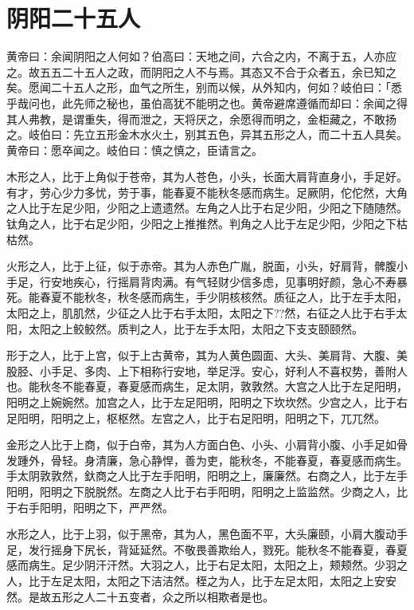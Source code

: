 \documentclass[a4paper,12pt,UTF8,twoside]{ctexbook}
\begin{document}
	\chapter{阴阳二十五人}
	
	黄帝曰：余闻阴阳之人何如？伯高曰：天地之间，六合之内，不离于五，人亦应之。故五五二十五人之政，而阴阳之人不与焉。其态又不合于众者五，余已知之矣。愿闻二十五人之形，血气之所生，别而以候，从外知内，何如？岐伯曰：「悉乎哉问也，此先师之秘也，虽伯高犹不能明之也。黄帝避席遵循而却曰：余闻之得其人弗教，是谓重失，得而泄之，天将厌之，余愿得而明之，金柜藏之，不敢扬之。岐伯曰：先立五形金木水火土，别其五色，异其五形之人，而二十五人具矣。黄帝曰：愿卒闻之。岐伯曰：慎之慎之，臣请言之。
	
	木形之人，比于上角似于苍帝，其为人苍色，小头，长面大肩背直身小，手足好。有才，劳心少力多忧，劳于事，能春夏不能秋冬感而病生。足厥阴，佗佗然，大角之人比于左足少阳，少阳之上遗遗然。左角之人比于右足少阳，少阳之下随随然。钛角之人，比于右足少阳，少阳之上推推然。判角之人比于左足少阳，少阳之下枯枯然。
	
	火形之人，比于上征，似于赤帝。其为人赤色广胤，脱面，小头，好肩背，髀腹小手足，行安地疾心，行摇肩背肉满。有气轻财少信多虑，见事明好颜，急心不寿暴死。能春夏不能秋冬，秋冬感而病生，手少阴核核然。质征之人，比于左手太阳，太阳之上，肌肌然，少征之人比于右手太阳，太阳之下??然，右征之人比于右手太阳，太阳之上鲛鲛然。质判之人，比于左手太阳，太阳之下支支颐颐然。
	
	形于之人，比于上宫，似于上古黄帝，其为人黄色圆面、大头、美肩背、大腹、美股胫、小手足、多肉、上下相称行安地，举足浮。安心，好利人不喜权势，善附人也。能秋冬不能春夏，春夏感而病生，足太阴，敦敦然。大宫之人比于左足阳明，阳明之上婉婉然。加宫之人，比于左足阳明，阳明之下坎坎然。少宫之人，比于右足阳明，阳明之上，枢枢然。左宫之人，比于右足阳明，阳明之下，兀兀然。
	
	金形之人比于上商，似于白帝，其为人方面白色、小头、小肩背小腹、小手足如骨发踵外，骨轻。身清廉，急心静悍，善为吏，能秋冬，不能春夏，春夏感而病生。手太阴敦敦然，釱商之人比于左手阳明，阳明之上，廉廉然。右商之人，比于左手阳明，阳明之下脱脱然。左商之人比于右手阳明，阳明之上监监然。少商之人，比于右手阳明，阳明之下，严严然。
	
	水形之人，比于上羽，似于黑帝，其为人，黑色面不平，大头廉颐，小肩大腹动手足，发行摇身下尻长，背延延然。不敬畏善欺绐人，戮死。能秋冬不能春夏，春夏感而病生。足少阴汗汗然。大羽之人，比于右足太阳，太阳之上，颊颊然。少羽之人，比于左足太阳，太阳之下洁洁然。桎之为人，比于左足太阳，太阳之上安安然。是故五形之人二十五变者，众之所以相欺者是也。
	
\end{document}
